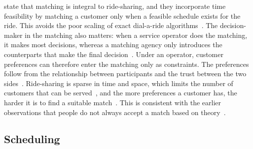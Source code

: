 \citet{masoud2017realtime} state that matching is integral to ride-sharing, and they incorporate time feasibility by matching a customer only when a feasible schedule exists for the ride. This avoids the poor scaling of exact dial-a-ride algorithms~\citep{cordeau2007dialaride}. The decision-maker in the matching also matters: when a service operator does the matching, it makes most decisions, whereas a matching agency only introduces the counterparts that make the final decision~\citep{furuhata2013ridesharing}. Under an operator, customer preferences can therefore enter the matching only as constraints. The preferences follow from the relationship between participants and the trust between the two sides~\citep{chaube2010trust}. Ride-sharing is sparse in time and space, which limits the number of customers that can be served~\citep{masoud2017realtime}, and the more preferences a customer has, the harder it is to find a suitable match~\citep{dailey1999seattle,agatz2012optimization}. This is consistent with the earlier observations that people do not always accept a match based on theory~\citep{hall1997dynamic}.

\subsection{Scheduling}

